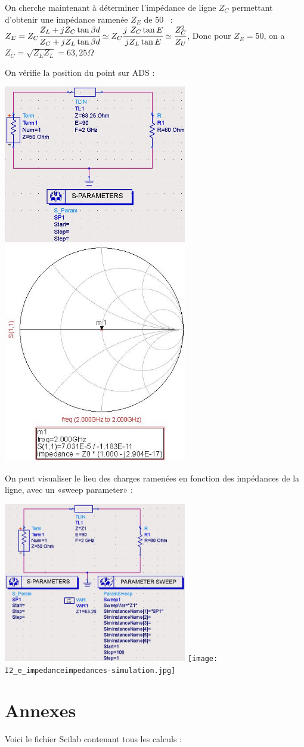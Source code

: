 \documentclass[10pt]{article}
\begin{document}
   On cherche maintenant à déterminer l’impédance de ligne $Z_C$ permettant d’obtenir une impédance ramenée $Z_E$ de 50 \Omega :
   $Z_E = Z_C \cfrac{Z_L +j Z_C\tan{\beta d}}{Z_C + j Z_L \tan{\beta d}} 
   \simeq Z_C \cfrac{j Z_C \tan{E}}{j Z_L \tan{E}}
   \simeq \cfrac{Z_C^2}{Z_U}$, 
   Donc pour $Z_E=50$, on a $Z_C=\sqrt{Z_E Z_L} = 63,25 \Omega$

   On vérifie la position du point sur ADS :

   \includegraphics[width=8cm]{I2_e_50-circuit.jpg}
   \includegraphics[width=8cm]{I2_e_50-simulation.jpg}

   On peut visualiser le lieu des charges ramenées en fonction des impédances de la ligne, avec un «sweep parameter» :

   \includegraphics[width=8cm]{I2_e_impedances-circuit.jpg}
   \texttt{[image: I2\_e\_impedanceimpedances-simulation.jpg]}



 \part{Annexes}
  Voici le fichier Scilab contenant tous les calculs :
\end{document}
